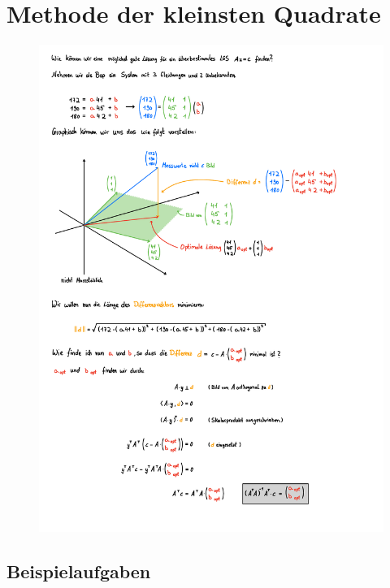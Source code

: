 \section{Methode der kleinsten Quadrate}
\begin{figure}[h!]
    \includegraphics[page=1, scale=0.842]{pdf/07_Methode_der_kleinsten_Quarate.pdf}
\end{figure}
\newpage



\subsection{Beispielaufgaben} 

